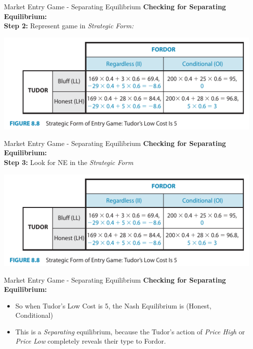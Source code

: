 
\begin{frame}{Market Entry Game - Separating Equilibrium}
  \textbf{Checking for Separating Equilibrium:} \\ 
  \textbf{Step 2:} Represent game in \textit{Strategic Form:}
  \begin{center}
    \includegraphics[width =.9\textwidth]{figures/Fig88.png} 
  \end{center}
\end{frame}


\begin{frame}{Market Entry Game - Separating Equilibrium}
  \textbf{Checking for Separating Equilibrium:} \\ 
  \textbf{Step 3:} Look for NE in the \textit{Strategic Form}
  \begin{center}
    \includegraphics[width =.9\textwidth]{figures/Fig88.png} 
  \end{center}
\end{frame}


\begin{frame}{Market Entry Game - Separating Equilibrium}
  \textbf{Checking for Separating Equilibrium:} \\ 
  \begin{itemize}
    \item So when Tudor's Low Cost is 5, 
    the Nash Equilibrium is (Honest, Conditional)
    \item This is a \textit{Separating} equilibrium,
    because the Tudor's action of \textit{Price High} or \textit{Price Low}
    completely reveals their type to Fordor.
  \end{itemize}
\end{frame}

